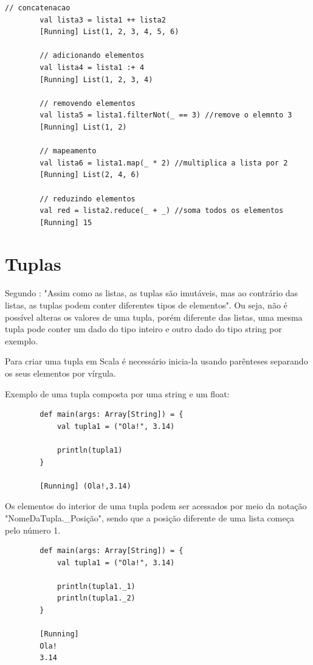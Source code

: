 	\begin{lstlisting}[breaklines]
		// concatenacao
		val lista3 = lista1 ++ lista2
		[Running] List(1, 2, 3, 4, 5, 6)
		
		// adicionando elementos
		val lista4 = lista1 :+ 4 
		[Running] List(1, 2, 3, 4)
		
		// removendo elementos
  		val lista5 = lista1.filterNot(_ == 3) //remove o elemnto 3
  		[Running] List(1, 2)
  		
  		// mapeamento
  		val lista6 = lista1.map(_ * 2) //multiplica a lista por 2
  		[Running] List(2, 4, 6)
  		
  		// reduzindo elementos
  		val red = lista2.reduce(_ + _) //soma todos os elementos
  		[Running] 15
	\end{lstlisting}

    \section{Tuplas}

	Segundo \cite{Odersky}: "Assim como as listas, as tuplas são imutáveis, mas ao contrário das listas, as tuplas podem conter diferentes tipos de elementos". Ou seja, não é possível alteras os valores de uma tupla, porém diferente das listas, uma mesma tupla pode conter um dado do tipo inteiro e outro dado do tipo string por exemplo.
	
	Para criar uma tupla em Scala é necessário inicia-la usando parênteses separando os seus elementos por vírgula.
	
	Exemplo de uma tupla composta por uma string e um float:
	
	\begin{lstlisting}
		def main(args: Array[String]) = {
			val tupla1 = ("Ola!", 3.14)
			
			println(tupla1)
		}
	
		[Running] (Ola!,3.14)
	\end{lstlisting}

	Os elementos do interior de uma tupla podem ser acessados por meio da notação "NomeDaTupla.\_Posição", sendo que a posição diferente de uma lista começa pelo número 1.
	
	\begin{lstlisting}
		def main(args: Array[String]) = {
			val tupla1 = ("Ola!", 3.14)
			
			println(tupla1._1)
			println(tupla1._2)
		}
	
		[Running]
		Ola!
		3.14
	\end{lstlisting}

